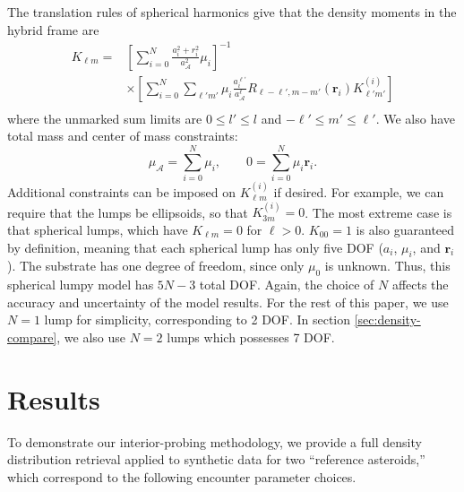 \documentclass[fleqn,usenatbib]{mnras}
\newcommand{\brackets}[1]{\left[ #1 \right]}
\begin{document}
The translation rules of spherical harmonics \cite{Gelderen1998TheSO} give that the density moments in the hybrid frame are
\begin{equation}
  \begin{aligned}
    K_{\ell m} = &\brackets{\sum_{i=0}^N \frac{a_i^2 + r_i^2}
    {a_\mathcal{A}^2}\mu_i}^{-1} \\
    &\times \brackets{\sum_{i=0}^N \sum_{\ell' m'}\mu_i
    \frac{a_i^{\ell'}}{a_\mathcal{A}^\ell}
    R_{\ell - \ell', m - m'}(\bm r_i)K_{\ell' m'}^{(i)}} \\
  \end{aligned}
\end{equation}
where the unmarked sum limits are $0 \leq l' \leq l$ and $-\ell' \leq m' \leq \ell'$. We also have total mass and center of mass constraints:
\begin{equation}
  \mu_\mathcal{A} = \sum_{i=0}^N \mu_i,  \qquad 0 = \sum_{i=0}^N \mu_i \bm r_i.
\end{equation}
Additional constraints can be imposed on $K_{\ell m}^{(i)}$ if desired. For example, we can require that the lumps be ellipsoids, so that $K_{3 m}^{(i)} = 0$. The most extreme case is that spherical lumps, which have $K_{\ell m} = 0$ for $\ell > 0$. $K_{00}=1$ is also guaranteed by definition, meaning that each spherical lump has only five DOF ($a_i$, $\mu_i$, and $\bm r_i$). The substrate has one degree of freedom, since only $\mu_0$ is unknown. Thus, this spherical lumpy model has $5N - 3$ total DOF. Again, the choice of $N$ affects the accuracy and uncertainty of the model results. For the rest of this paper, we use $N=1$ lump for simplicity, corresponding to 2 DOF. In section \ref{sec:density-compare}, we also use $N=2$ lumps which possesses 7 DOF.



\section{Results}
\label{sec:results}

To demonstrate our interior-probing methodology, we provide a full density distribution retrieval applied to synthetic data for two ``reference asteroids,'' which correspond to the following encounter parameter choices.
\end{document}
